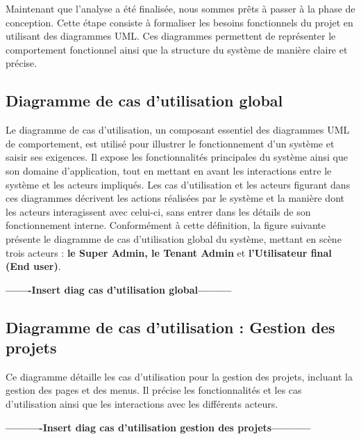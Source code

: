\hspace{\parindent}Maintenant que l'analyse a été finalisée, nous sommes prêts à passer à la phase de conception. Cette étape consiste à formaliser les besoins fonctionnels du projet en utilisant des diagrammes UML. Ces diagrammes permettent de représenter le comportement fonctionnel ainsi que la structure du système de manière claire et précise.

\subsection{Diagramme de cas d’utilisation global}

\hspace{\parindent}Le diagramme de cas d'utilisation, un composant essentiel des diagrammes UML de comportement, est utilisé pour illustrer le fonctionnement d'un système et saisir ses exigences. Il expose les fonctionnalités principales du système ainsi que son domaine d'application, tout en mettant en avant les interactions entre le système et les acteurs impliqués. Les cas d'utilisation et les acteurs figurant dans ces diagrammes décrivent les actions réalisées par le système et la manière dont les acteurs interagissent avec celui-ci, sans entrer dans les détails de son fonctionnement interne. Conformément à cette définition, la figure suivante présente le diagramme de cas d'utilisation global du système, mettant en scène trois acteurs : \textbf{le Super Admin, le Tenant Admin} et \textbf{l'Utilisateur final (End user)}.


\textbf{-------Insert diag cas d'utilisation global---------}







\subsection{Diagramme de cas d’utilisation : Gestion des projets}

\hspace{\parindent}Ce diagramme détaille les cas d'utilisation pour la gestion des projets, incluant la gestion des pages et des menus. Il précise les fonctionnalités et les cas d'utilisation ainsi que les interactions avec les différents acteurs.

\textbf{----------Insert diag cas d'utilisation gestion des projets-----------}


